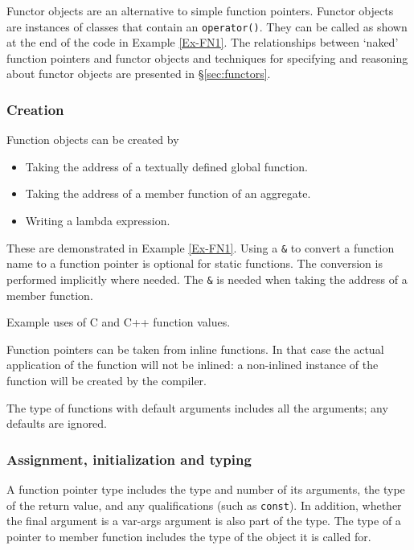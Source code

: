 Functor objects are an alternative to simple function pointers.
Functor objects are instances of classes that contain an 
\lstinline|operator()|. 
They can be called as shown at the end
of the code in Example \ref{Ex-FN1}. 
The relationships between
`naked' function pointers and functor objects and techniques for 
specifying and reasoning about functor objects are presented in \S\ref{sec:functors}.

\subsubsection{Creation}

Function objects can be created by
\begin{itemize}[noitemsep,nolistsep]
	\item Taking the address of a textually defined global function.
	\item Taking the address of a member function of an aggregate.
	\item Writing a lambda expression.
\end{itemize}
These are demonstrated in Example \ref{Ex-FN1}.
Using a \lstinline|&| to convert a function name to a function
pointer is optional for static functions. The conversion is performed implicitly where needed. The \lstinline|&| is needed when taking the address
of a member function.
\begin{example}
	 \label{Ex-FN1}
	Example uses of C and C++ function values.
\end{example}

Function pointers can be taken from inline functions. In that case 
the actual application of the function will not be inlined: a 
non-inlined instance of the function will be created by the compiler.

The type of functions with default arguments includes all the arguments; any defaults are ignored.

\subsubsection{Assignment, initialization and typing}
A function pointer type includes the type and number of its arguments,
the type of the return value, and any qualifications (such as
\lstinline|const|).  In addition, whether the final argument is a
var-args argument is also part of the type.  The type of a pointer to
member function includes the type of the object it is called for.

